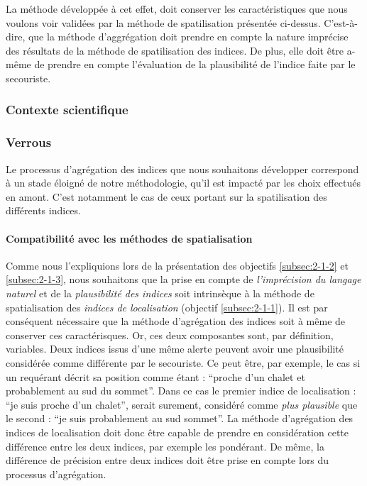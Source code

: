 La méthode développée à cet effet, doit conserver les caractéristiques
que nous voulons voir validées par la méthode de spatilisation
présentée ci-dessus. C'est-à-dire, que la méthode d'aggrégation doit
prendre en compte la nature imprécise des résultats de la méthode de
spatilisation des indices. De plus, elle doit être a-même de prendre
en compte l'évaluation de la plausibilité de l'indice faite par le
secouriste.

\subsubsection{Contexte scientifique}


\subsubsection{Verrous}

Le processus d'agrégation des indices que nous souhaitons développer
correspond à un stade éloigné de notre méthodologie, \ie qu'il est
impacté par les choix effectués en amont. C'est notamment le cas de
ceux portant sur la spatilisation des différents indices.

\paragraph{Compatibilité avec les méthodes de spatialisation}

Comme nous l'expliquions lors de la présentation des objectifs
\ref{subsec:2-1-2} et \ref{subsec:2-1-3}, nous souhaitons que la prise
en compte de \emph{l'imprécision du langage naturel} et de la
\emph{plausibilité des indices} soit intrinsèque à la méthode de
spatialisation des \emph{indices de localisation} (objectif
\ref{subsec:2-1-1}). Il est par conséquent nécessaire que la méthode
d'agrégation des indices soit à même de conserver ces caractérisques.
% 
Or, ces deux composantes sont, par définition, variables. Deux indices
issus d'une même alerte peuvent avoir une plausibilité considérée
comme différente par le secouriste. Ce peut être, par exemple, le cas
si un requérant décrit sa position comme étant : \enquote{proche d'un
  chalet et probablement au sud du sommet}. Dans ce cas le premier
indice de localisation : \enquote{je suis proche d'un chalet}, serait
surement, considéré comme \emph{plus plausible} que le second :
\enquote{je suis probablement au sud sommet}. La méthode d'agrégation
des indices de localisation doit donc être capable de prendre en
considération cette différence entre les deux indices, par exemple les
pondérant. De même, la différence de précision entre deux indices doit
être prise en compte lors du processus d'agrégation.

